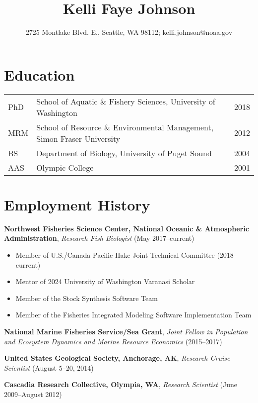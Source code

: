 \documentclass[10pt]{article}
\title{\bfseries\Large Kelli Faye Johnson}
\author{2725 Montlake Blvd. E., Seattle, WA 98112; kelli.johnson@noaa.gov}
\date{}
\begin{document}

\maketitle
\vspace{-15mm}
\noindent\makebox[\linewidth]{\rule{\paperwidth}{0.4pt}}

\section*{Education}
\begin{tabular}{lll}
PhD & School of Aquatic \& Fishery Sciences, University of Washington & 2018 \\
MRM & School of Resource \& Environmental Management, Simon Fraser University & 2012 \\
BS & Department of Biology, University of Puget Sound & 2004 \\
AAS & Olympic College & 2001 \\
\end{tabular}

\section*{Employment History}

\textbf{Northwest Fisheries Science Center, National Oceanic \& Atmospheric Administration}, \textit{Research Fish Biologist} (May 2017--current)
\begin{itemize}
\vspace{-2.5mm}
  \item Member of U.S./Canada Pacific Hake Joint Technical Committee (2018--current)
  \item Mentor of 2024 University of Washington Varanasi Scholar
  \item Member of the Stock Synthesis Software Team
  \item Member of the Fisheries Integrated Modeling Software Implementation Team
\end{itemize}

\noindent \textbf{National Marine Fisheries Service/Sea Grant}, \textit{Joint Fellow in Population and Ecosystem Dynamics and Marine Resource Economics} (2015--2017)

\noindent \textbf{United States Geological Society, Anchorage, AK}, \textit{Research Cruise Scientist} (August 5--20, 2014)

\noindent \textbf{Cascadia Research Collective, Olympia, WA}, \textit{Research Scientist} (June 2009--August 2012)
\end{document}
